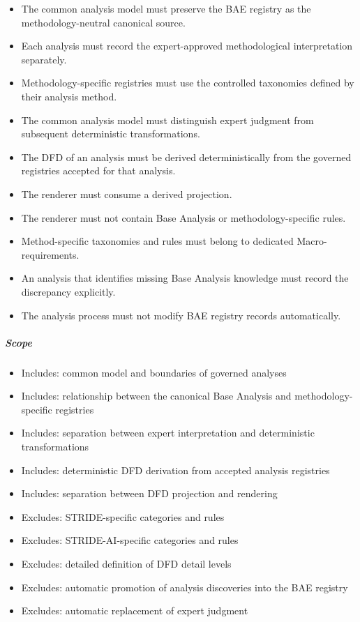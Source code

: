 \documentclass[
  10pt,
]{article}
\providecommand{\tightlist}{%
  \setlength{\itemsep}{0pt}\setlength{\parskip}{0pt}}
\begin{document}
\begin{itemize}
\tightlist
\item
  The common analysis model must preserve the BAE registry as the
  methodology-neutral canonical source.
\item
  Each analysis must record the expert-approved methodological
  interpretation separately.
\item
  Methodology-specific registries must use the controlled taxonomies
  defined by their analysis method.
\item
  The common analysis model must distinguish expert judgment from
  subsequent deterministic transformations.
\item
  The DFD of an analysis must be derived deterministically from the
  governed registries accepted for that analysis.
\item
  The renderer must consume a derived projection.
\item
  The renderer must not contain Base Analysis or methodology-specific
  rules.
\item
  Method-specific taxonomies and rules must belong to dedicated
  Macro-requirements.
\item
  An analysis that identifies missing Base Analysis knowledge must
  record the discrepancy explicitly.
\item
  The analysis process must not modify BAE registry records
  automatically.
\end{itemize}

\subparagraph{Scope}\label{scope-5}

\begin{itemize}
\tightlist
\item
  Includes: common model and boundaries of governed analyses
\item
  Includes: relationship between the canonical Base Analysis and
  methodology-specific registries
\item
  Includes: separation between expert interpretation and deterministic
  transformations
\item
  Includes: deterministic DFD derivation from accepted analysis
  registries
\item
  Includes: separation between DFD projection and rendering
\item
  Excludes: STRIDE-specific categories and rules
\item
  Excludes: STRIDE-AI-specific categories and rules
\item
  Excludes: detailed definition of DFD detail levels
\item
  Excludes: automatic promotion of analysis discoveries into the BAE
  registry
\item
  Excludes: automatic replacement of expert judgment
\end{itemize}
\end{document}
